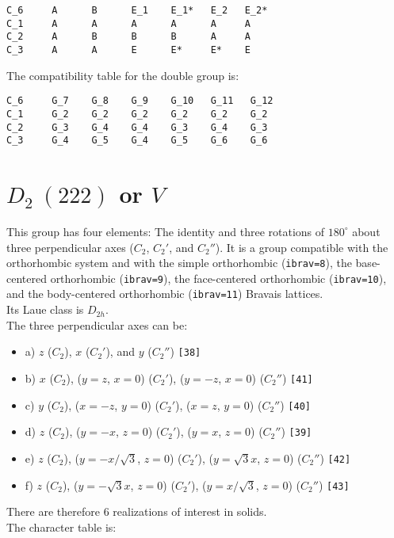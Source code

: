 \documentclass[12pt,a4paper,twoside]{report}
\begin{document}
\begin{tcolorbox}
\begin{footnotesize}
\begin{verbatim}
C_6     A      B      E_1    E_1*   E_2   E_2* 
C_1     A      A      A      A      A     A
C_2     A      B      B      B      A     A
C_3     A      A      E      E*     E*    E
\end{verbatim}
\end{footnotesize}
\end{tcolorbox}

The compatibility table for the double group is:

\begin{tcolorbox}
\begin{footnotesize}
\begin{verbatim}
C_6     G_7    G_8    G_9    G_10   G_11   G_12 
C_1     G_2    G_2    G_2    G_2    G_2    G_2
C_2     G_3    G_4    G_4    G_3    G_4    G_3
C_3     G_4    G_5    G_4    G_5    G_6    G_6
\end{verbatim}
\end{footnotesize}
\end{tcolorbox}


\newpage
{\color{coral}\section{$D_2\ (222)$ or $V$}} 
\color{black}
This group has four elements: The identity and three rotations of $180^\circ$ about 
three perpendicular axes ($C_2$, $C_2'$, and $C_2''$). It is a group compatible with 
the orthorhombic system and with the simple orthorhombic (\texttt{ibrav=8}), 
the base-centered orthorhombic (\texttt{ibrav=9}), the face-centered orthorhombic 
(\texttt{ibrav=10}), and the body-centered orthorhombic (\texttt{ibrav=11}) Bravais 
lattices. \\ 
Its Laue class is $D_{2h}$. \\
The three perpendicular axes can be: 
\begin{itemize}
\item
a) $z$ ($C_2$), $x$ ($C_2'$), and $y$ ($C_2''$) \texttt{[38]}
\item
b) $x$ ($C_2$), ($y=z$, $x=0$) ($C_2'$), ($y=-z$, $x=0$) ($C_2''$) \texttt{[41]}
\item
c) $y$ ($C_2$), ($x=-z$, $y=0$) ($C_2'$), ($x=z$, $y=0$) ($C_2''$) \texttt{[40]}
\item
d) $z$ ($C_2$), ($y=-x$, $z=0$) ($C_2'$), ($y=x$, $z=0$) ($C_2''$) \texttt{[39]}
\item
e) $z$ ($C_2$), ($y=-x/\sqrt{3}$, $z=0$) ($C_2'$), ($y=\sqrt{3}x$, $z=0$) ($C_2''$) \texttt{[42]}
\item
f) $z$ ($C_2$), ($y=-\sqrt{3}x$, $z=0$) ($C_2'$), ($y=x/\sqrt{3}$, $z=0$) ($C_2''$) \texttt{[43]}
\end{itemize}
There are therefore $6$ realizations of interest in solids. \\
The character table is:
\end{document}
